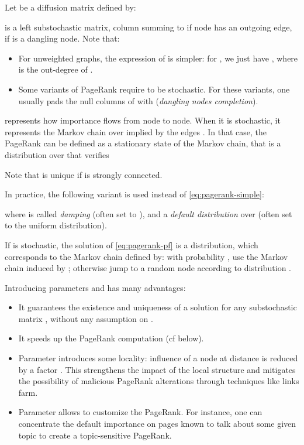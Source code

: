 \documentclass{llncs}
\begin{document}
Let  be a  diffusion matrix defined by:




 is a left substochastic matrix, column  summing to  if node  has an outgoing edge,  if  is a dangling node. Note that:
\begin{itemize}
\item For unweighted graphs, the expression of  is simpler: for , we just have , where  is the out-degree of .
\item Some variants of PageRank require  to be stochastic.
For these variants, one usually pads the null columns of  with  (\emph{dangling nodes completion}).
\end{itemize}


 represents how importance flows from node to node. When it is stochastic, it represents the Markov chain over  implied by the edges . In that case, the PageRank can be defined as a stationary state of the Markov chain, that is a distribution  over  that verifies

Note that  is unique if  is strongly connected.



In practice, the following variant is used instead of \eqref{eq:pagerank-simple}:

\noindent where  is called \emph{damping} (often set to ), and  a \emph{default distribution} over  (often set to the uniform distribution).

If  is stochastic, the solution  of \eqref{eq:pagerank-pf} is a distribution, which corresponds to the Markov chain defined by: with probability , use the Markov chain induced by ; otherwise jump to a random node according to distribution .

Introducing parameters  and  has many advantages:
\begin{itemize}
\item It guarantees the existence and uniqueness of a solution for any substochastic matrix , without any assumption on .
\item It speeds up the PageRank computation (cf below).
\item Parameter  introduces some locality: influence of a node at distance  is reduced by a factor . This strengthens the impact of the local structure and mitigates the possibility of malicious PageRank alterations through techniques like links farm\cite{BM05}.
\item Parameter  allows to customize the PageRank. For instance, one can concentrate the default importance on pages known to talk about some given topic to create a topic-sensitive PageRank\cite{HT02}.
\end{itemize}
\end{document}
